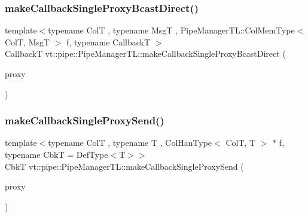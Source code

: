 \mbox{\label{structvt_1_1pipe_1_1_pipe_manager_t_l_a41fec001a4e698cb2bac888a6a48d606}} 
\subsubsection{\texorpdfstring{make\+Callback\+Single\+Proxy\+Bcast\+Direct()}{makeCallbackSingleProxyBcastDirect()}\hspace{0.1cm}{\footnotesize\ttfamily [3/3]}}
{\footnotesize\ttfamily template$<$typename ColT , typename MsgT , Pipe\+Manager\+T\+L\+::\+Col\+Mem\+Type$<$ Col\+T, Msg\+T $>$ f, typename CallbackT $>$ \\
CallbackT vt\+::pipe\+::\+Pipe\+Manager\+T\+L\+::make\+Callback\+Single\+Proxy\+Bcast\+Direct (\begin{DoxyParamCaption}\item[{\hyperlink{structvt_1_1pipe_1_1_pipe_manager_t_l_af56c58cad882496e35f01227d4da3898}{Col\+Proxy\+Type}$<$ ColT $>$}]{proxy }\end{DoxyParamCaption})}

\mbox{\label{structvt_1_1pipe_1_1_pipe_manager_t_l_a2c8c3a5aca22b2526fe68dd543a8a888}} 
\subsubsection{\texorpdfstring{make\+Callback\+Single\+Proxy\+Send()}{makeCallbackSingleProxySend()}\hspace{0.1cm}{\footnotesize\ttfamily [1/3]}}
{\footnotesize\ttfamily template$<$typename ColT , typename T , Col\+Han\+Type$<$ Col\+T, T $>$ $\ast$ f, typename CbkT  = Def\+Type$<$\+T$>$$>$ \\
CbkT vt\+::pipe\+::\+Pipe\+Manager\+T\+L\+::make\+Callback\+Single\+Proxy\+Send (\begin{DoxyParamCaption}\item[{typename Col\+T\+::\+Proxy\+Type}]{proxy }\end{DoxyParamCaption})}

